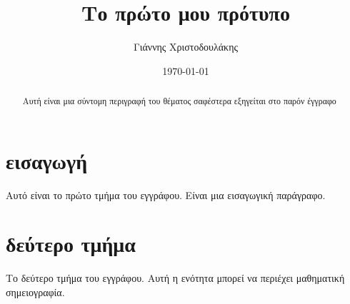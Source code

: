 \documentclass[10pt,a4paper]{article}
\author{Γιάννης Χριστοδουλάκης}
\title{Το πρώτο μου πρότυπο}
\date{\today}
\begin{document}
\begin{titlepage}
\maketitle
\end{titlepage}

\tableofcontents

\begin{abstract}
Αυτή είναι μια σύντομη περιγραφή του θέματος 
σαφέστερα εξηγείται στο παρόν έγγραφο
\end{abstract}

\section{εισαγωγή}
Αυτό είναι το πρώτο τμήμα του εγγράφου. 
Είναι μια εισαγωγική παράγραφο.

\section{δεύτερο τμήμα}
Το δεύτερο τμήμα του εγγράφου. Αυτή η ενότητα 
μπορεί να περιέχει μαθηματική σημειογραφία.
\end{document}
